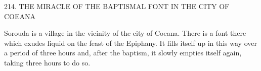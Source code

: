 214.
THE MIRACLE OF THE BAPTISMAL FONT
IN THE CITY OF COEANA

Sorouda is a village in the vicinity of the city of Coeana.
There is a
font there which exudes liquid on the feast of the Epiphany.
It fills
itself up in this way over a period of three hours and, after the
baptism, it slowly empties itself again, taking three hours to do so.

